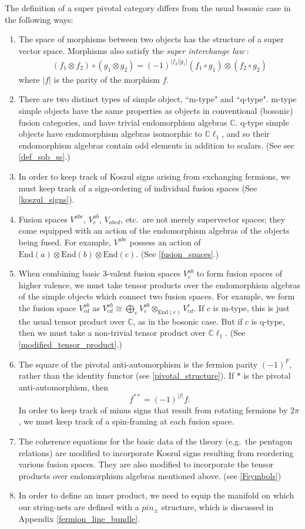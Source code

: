 \documentclass[12pt,a4paper]{article}
\newcommand{\tp}{\otimes}
\newcommand{\cc}{\mathbb{C}}
\newcommand\be            {\begin{equation}}
\newcommand\ee            {\end{equation}}
\newcommand{\End}{\text{End}}
\newcommand{\cl}{\mathbb{C}\ell}
\begin{document}
The definition of a super pivotal category differs from the usual bosonic case in the following ways:

\begin{enumerate}
	\item The space of morphisms between two objects has the structure of 
	a super vector space.
	Morphisms also satisfy the {\em super interchange law} \cite{usher2016}:
	\begin{align}
	(f_1\tp f_2) \circ (g_1\tp g_2) = (-1)^{|f_2| |g_1|} (f_1\circ g_1)\tp (f_2\circ g_2)
	\end{align}
	where $|f|$ is the parity of the morphism $f$. 
	\item There are two distinct types of simple object, ``m-type" and ``q-type".
	m-type simple objects have the same properties as objects in conventional (bosonic) fusion categories, and have trivial endomorphism algebras $\cc$.  
	q-type simple objects have endomorphism algebras isomorphic to $\cl_1$, 
	and so their endomorphism algebras contain odd elements in addition to scalars. (See sec \ref{def_sob_ss}.)
	\item In order to keep track of Koszul signs arising from exchanging fermions, 
	we must keep track of a sign-ordering of individual fusion spaces (See \ref{koszul_signs}).
	\item Fusion spaces $V^{abc}$, $V^{ab}_c$, $V_{abcd}$, etc.\ are not merely supervector spaces; they come equipped with an action of the
	endomorphism algebras of the objects being fused. 
	For example, $V^{abc}$ possess an action of $\End(a)\tp \End(b)\tp \End(c)$.
	(See \ref{fusion_spaces}.)
	\item When combining basic 3-valent fusion spaces $V^{ab}_c$ to form fusion spaces of higher valence, we must take
	tensor products over the endomorphism algebras of the simple objects which connect two fusion spaces. 
	For example, we form the fusion space $V^{ab}_{cd}$ as $V^{ab}_{cd} \cong \bigoplus_e V^{ab}_c \tp_{\End(e)} V^e_{cd}$.
	If $c$ is m-type, this is just the usual tensor product over $\cc$, as in the bosonic case.
	But if $c$ is q-type, then we must take a non-trivial tensor product over $\cl_1$.
	(See \ref{modified_tensor_product}.)
	\item The square of the pivotal anti-automorphism is 
	the fermion parity $(-1)^F$, rather than the identity functor (see \ref{pivotal_structure}). 
	If $*$ is the pivotal anti-automorphism, then 
	\be f^{**} = (-1)^{|f|}f.\ee
	In order to keep track of minus signs that result from rotating fermions by $2\pi$, we must keep track of a spin-framing at each fusion space. 
	\item The coherence equations for the basic data of the theory (e.g.\ the pentagon relations) are modified to incorporate  
	 Koszul signs resulting from reordering various fusion spaces. 
	 They are also modified to incorporate the tensor products over endomorphism algebras mentioned above. (see \ref{Fsymbols})
	\item In order to define an inner product, we need to equip the manifold on which our string-nets are 
	defined with a $pin_\pm$ structure, which is discussed in Appendix \ref{fermion_line_bundle}.
\end{enumerate}
\end{document}
